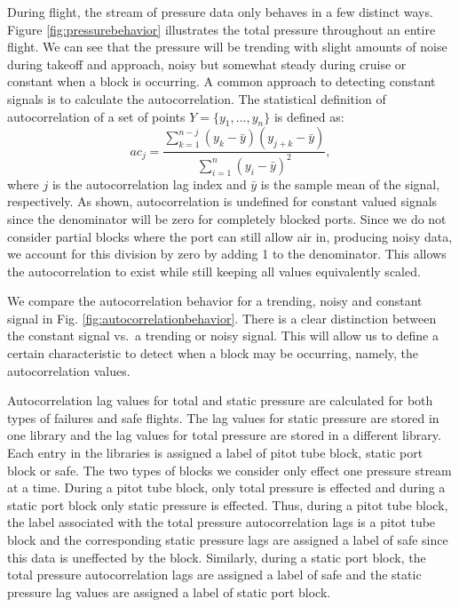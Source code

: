 \documentclass[]{aiaa-tc}
\begin{document}
During flight, the stream of pressure data only behaves in a few distinct ways. Figure \ref{fig:pressurebehavior} illustrates the total pressure throughout an entire flight. We can see that the pressure will be trending with slight amounts of noise during takeoff and approach, noisy but somewhat steady during cruise or constant when a block is occurring. A common approach to detecting constant signals is to calculate the autocorrelation. The statistical definition of autocorrelation of a set of points $Y = \{y_1,...,y_n\}$ is defined as: 
\begin{equation}
ac_j = \frac{\displaystyle\sum_{k=1}^{n-j}({y_k-\bar{y}})({y_{j+k}-\bar{y}})}{\displaystyle \sum_{i=1}^n (y_i - \bar{y})^2},
\label{eq:autocor}
\end{equation}
where $j$ is the autocorrelation lag index and $\bar{y}$ is the sample mean of the signal, respectively\cite{autocorrelation}. As shown, autocorrelation is undefined for constant valued signals since the denominator will be zero for completely blocked ports. Since we do not consider partial blocks where the port can still allow air in, producing noisy data, we account for this division by zero by adding 1 to the denominator. This allows the autocorrelation to exist while still keeping all values equivalently scaled.

We compare the autocorrelation behavior for a trending, noisy and constant signal in Fig. \ref{fig:autocorrelationbehavior}. There is a clear distinction between the constant signal vs.\ a trending or noisy signal. This will allow us to define a certain characteristic to detect when a block may be occurring, namely, the autocorrelation values. 

Autocorrelation lag values for total and static pressure are calculated for both types of failures and safe flights. The lag values for static pressure are stored in one library and the lag values for total pressure are stored in a different library. Each entry in the libraries is assigned a label of pitot tube block, static port block or safe. The two types of blocks we consider only effect one pressure stream at a time. During a pitot tube block, only total pressure is effected and during a static port block only static pressure is effected. Thus, during a pitot tube block, the label associated with the total pressure autocorrelation lags is a pitot tube block and the corresponding static pressure lags are assigned a label of safe since this data is uneffected by the block. Similarly, during a static port block, the total pressure autocorrelation lags are assigned a label of safe and the static pressure lag values are assigned a label of static port block. 
\end{document}
